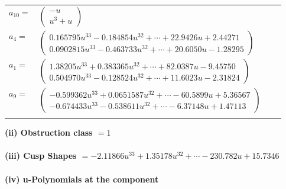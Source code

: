 \documentclass[1p]{elsarticle_modified}
\theoremstyle{definition}
\begin{document}
\begin{tabular}{m{7pt} m{180pt} m{7pt} m{180pt} }
\flushright $a_{10}=$&$\begin{pmatrix}- u\\u^3+u\end{pmatrix}$ \\
\flushright $a_{4}=$&$\begin{pmatrix}0.165795 u^{33}-0.184854 u^{32}+\cdots+22.9426 u+2.44271\\0.0902815 u^{33}-0.463733 u^{32}+\cdots+20.6050 u-1.28295\end{pmatrix}$ \\
\flushright $a_{1}=$&$\begin{pmatrix}1.38205 u^{33}+0.383365 u^{32}+\cdots+82.0387 u-9.45750\\0.504970 u^{33}-0.128524 u^{32}+\cdots+11.6023 u-2.31824\end{pmatrix}$ \\
\flushright $a_{9}=$&$\begin{pmatrix}-0.599362 u^{33}+0.0651587 u^{32}+\cdots-60.5899 u+5.36567\\-0.674433 u^{33}-0.538611 u^{32}+\cdots-6.37148 u+1.47113\end{pmatrix}$\\&\end{tabular}
\flushleft \textbf{(ii) Obstruction class $= 1$}\\~\\
\flushleft \textbf{(iii) Cusp Shapes $= -2.11866 u^{33}+1.35178 u^{32}+\cdots-230.782 u+15.7346$}\\~\\
\newpage\renewcommand{\arraystretch}{1}
\flushleft \textbf{(iv) u-Polynomials at the component}\newline \\
\end{document}
